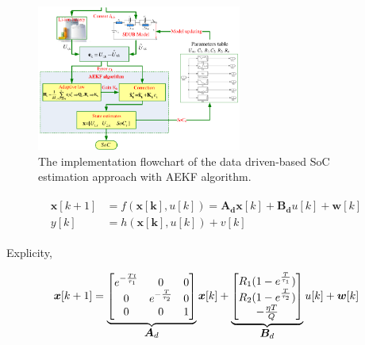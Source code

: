 \documentclass[12pt]{article}
\begin{document}
\begin{figure}[t!]
	\centering
	\includegraphics[width=0.6\textwidth, keepaspectratio]{images/Data_Driven_SoC_Estimation_Approach_With_AEKF_Algorithm.pdf}
	\caption{The implementation flowchart of the data driven-based SoC estimation approach with AEKF algorithm. \cite{Xiong2013}}
	\label{fig:AEKF_Algorithm_Flowchart}
\end{figure}

\begin{align}
	\label{eqn:discrete_state_space_matrix_form_for_EKF_1}
	\begin{split}
		\bm{x}[k+1] &= f(\bm{x[k]},u[k]) =\bm{A_{d}}\bm{x}[k] + \bm{B_{d}}u[k] + \bm{w}[k]\\
		y[k] &= h(\bm{x[k]},u[k]) + v[k]
	\end{split}
\end{align}

\noindent Explicity,

\begin{equation}
	\label{eqn:discrete_state_space_matrix_form_for_EKF_2}
	\bm{x}[k+1] = \underbrace{\begin{bmatrix}
			e^{-\frac{Tt}{\tau_{1}}} & 0 & 0\\
			0 & e^{-\frac{T}{\tau_{2}}} & 0 \\
			0 & 0 & 1
	\end{bmatrix}}_{\let\scriptstyle\textstyle\substack{\bm{A}_{d}}} \bm{x}[k] + \underbrace{\begin{bmatrix}
			R_{1}(1 - e^{\frac{T}{\tau_{1}}})  \\
			R_{2}(1 - e^{\frac{T}{\tau_{2}}})  \\
			-\frac{\eta T}{Q}
	\end{bmatrix}}_{\let\scriptstyle\textstyle\substack{\bm{B}_{d}}} u[k]
	+ \bm{w}[k]
\end{equation}
\end{document}
